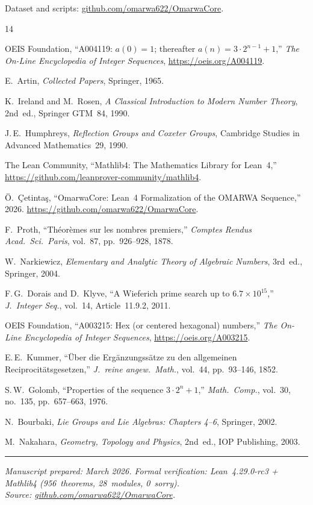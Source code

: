 \documentclass[11pt, a4paper]{article}
\theoremstyle{plain}
\theoremstyle{definition}
\theoremstyle{remark}
\begin{document}
\noindent Dataset and scripts:
\href{https://github.com/omarwa622/OmarwaCore}{github.com/omarwa622/OmarwaCore}.


\begin{thebibliography}{14}

OEIS Foundation,
``A004119: $a(0) = 1$; thereafter $a(n) = 3 \cdot 2^{n-1} + 1$,''
\textit{The On-Line Encyclopedia of Integer Sequences},
\url{https://oeis.org/A004119}.

E.~Artin,
\textit{Collected Papers},
Springer, 1965.

K.~Ireland and M.~Rosen,
\textit{A Classical Introduction to Modern Number Theory}, 2nd~ed.,
Springer GTM~84, 1990.

J.\,E.~Humphreys,
\textit{Reflection Groups and Coxeter Groups},
Cambridge Studies in Advanced Mathematics~29, 1990.

The Lean Community,
``Mathlib4: The Mathematics Library for Lean~4,''
\url{https://github.com/leanprover-community/mathlib4}.

\"O.~\c{C}etinta\c{s},
``OmarwaCore: Lean~4 Formalization of the OMARWA Sequence,''
2026.
\url{https://github.com/omarwa622/OmarwaCore}.

F.~Proth,
``Th\'eor\`emes sur les nombres premiers,''
\textit{Comptes Rendus Acad.\ Sci.\ Paris},
vol.~87, pp.~926--928, 1878.

W.~Narkiewicz,
\textit{Elementary and Analytic Theory of Algebraic Numbers},
3rd~ed., Springer, 2004.

F.\,G.~Dorais and D.~Klyve,
``A Wieferich prime search up to $6.7 \times 10^{15}$,''
\textit{J.\ Integer Seq.},
vol.~14, Article~11.9.2, 2011.

OEIS Foundation,
``A003215: Hex (or centered hexagonal) numbers,''
\textit{The On-Line Encyclopedia of Integer Sequences},
\url{https://oeis.org/A003215}.

E.\,E.~Kummer,
``\"Uber die Erg\"anzungss\"atze zu den allgemeinen
Reciprocit\"atsgesetzen,''
\textit{J.~reine angew.~Math.}, vol.~44, pp.~93--146, 1852.

S.\,W.~Golomb,
``Properties of the sequence $3 \cdot 2^n + 1$,''
\textit{Math.\ Comp.},
vol.~30, no.~135, pp.~657--663, 1976.

N.~Bourbaki,
\textit{Lie Groups and Lie Algebras: Chapters 4--6},
Springer, 2002.

M.~Nakahara,
\textit{Geometry, Topology and Physics}, 2nd~ed.,
IOP Publishing, 2003.

\end{thebibliography}

\bigskip
\noindent\rule{\textwidth}{0.4pt}

\smallskip
{\small\noindent\textit{Manuscript prepared: March 2026.
Formal verification: Lean~4.29.0-rc3 + Mathlib4 (956~theorems,
28~modules, 0~sorry).}\\
\textit{Source:
\href{https://github.com/omarwa622/OmarwaCore}{github.com/omarwa622/OmarwaCore}.}}
\end{document}
